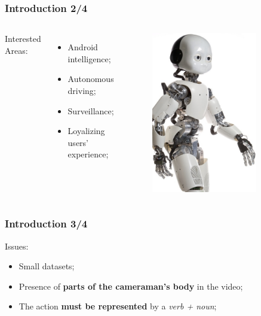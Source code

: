 \documentclass{beamer}
\begin{document}
\begin{frame}
\frametitle{Introduction 2/4}
\begin{columns}
Interested Areas:
\begin{itemize}
\item Android intelligence;
\item Autonomous driving;
\item Surveillance;
\item Loyalizing users' experience;
\end{itemize}
\begin{figure}
\includegraphics[width=0.8\textwidth]{./schemi/icub}
\end{figure}
\end{columns}
\end{frame}

\begin{frame}
\frametitle{Introduction 3/4}
Issues:
\begin{itemize}
\item Small datasets;
\item Presence of \textbf{parts of the cameraman's body} in the video;
\item The action \textbf{must be represented} by a \emph{verb + noun};
\end{itemize}
\end{frame}
\end{document}
